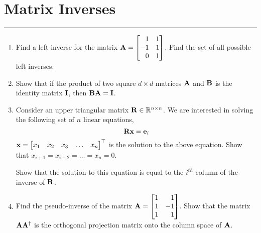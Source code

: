 \documentclass[
11pt, %
a4paper, %
oneside, %
headinclude,footinclude, %
BCOR5mm, %
]{scrartcl}
\def\mf{\ensuremath\mathbf}
\def\mb{\ensuremath\mathbb}
\def\bmx{\ensuremath\begin{bmatrix*}[r]}
\def\emx{\ensuremath\end{bmatrix*}}
\def\bmxc{\ensuremath\begin{bmatrix*}[c]}
\begin{document}
\newpage
\section{Matrix Inverses}
\hrule
\vspace{0.5cm}

\begin{enumerate}
	\item Find a left inverse for the matrix $\mf{A} = \bmx 1 & 1 \\ -1 & 1 \\ 0 & 1\emx$. Find the set of all possible left inverses. 
	
	\item Show that if the product of two square $d \times d$ matrices $\mf{A}$ and $\mf{B}$ is the identity matrix $\mf{I}$, then $\mf{B}\mf{A} = \mf{I}$.
	
	\item Consider an upper triangular matrix $\mf{R} \in \mb{R}^{n \times n}$. We are interested in solving the following set of $n$ linear equations,
	\[ \mf{R} \mf{x} = \mf{e}_i \]
	$\mf{x} = \bmxc x_1 & x_2 & x_3 & \ldots & x_n \emx^\top$ is the solution to the above equation. Show that $x_{i+1} = x_{i+2} = \ldots = x_n = 0$.

	Show that the solution to this equation is equal to the $i^{th}$ column of the inverse of $\mf{R}$.

	\item Find the pseudo-inverse of the matrix $\mf{A} = \bmx 1 & 1 \\ 1 & -1 \\ 1 & 1 \emx$. Show that the matrix $\mf{A}\mf{A}^\dagger$ is the orthogonal projection matrix onto the column space of $\mf{A}$.
\end{enumerate}
\end{document}
